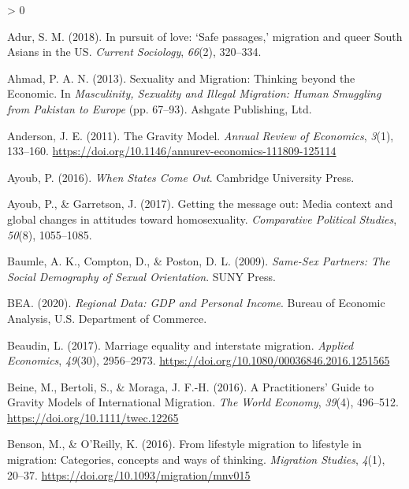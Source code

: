 \documentclass[
  11pt,
]{article}
\newlength{\cslhangindent}
\newenvironment{CSLReferences}[2] %
 {%
  \setlength{\parindent}{0pt}
  \ifodd #1 \everypar{\setlength{\hangindent}{\cslhangindent}}\ignorespaces\fi
  \ifnum #2 > 0
  \setlength{\parskip}{#2\baselineskip}
  \fi
 }%
 {}
\begin{document}
\hypertarget{refs}{}
\begin{CSLReferences}{1}{0}
\leavevmode\hypertarget{ref-adur_2018}{}%
Adur, S. M. (2018). In pursuit of love: {`{Safe} passages,'} migration and queer {South Asians} in the {US}. \emph{Current Sociology}, \emph{66}(2), 320--334.

\leavevmode\hypertarget{ref-ahmad_2013}{}%
Ahmad, P. A. N. (2013). Sexuality and {Migration}: {Thinking} beyond the {Economic}. In \emph{Masculinity, {Sexuality} and {Illegal Migration}: {Human Smuggling} from {Pakistan} to {Europe}} (pp. 67--93). {Ashgate Publishing, Ltd.}

\leavevmode\hypertarget{ref-anderson_2011}{}%
Anderson, J. E. (2011). The {Gravity Model}. \emph{Annual Review of Economics}, \emph{3}(1), 133--160. \url{https://doi.org/10.1146/annurev-economics-111809-125114}

\leavevmode\hypertarget{ref-ayoub_2016}{}%
Ayoub, P. (2016). \emph{When {States Come Out}}. {Cambridge University Press}.

\leavevmode\hypertarget{ref-ayoub_2017}{}%
Ayoub, P., \& Garretson, J. (2017). Getting the message out: {Media} context and global changes in attitudes toward homosexuality. \emph{Comparative Political Studies}, \emph{50}(8), 1055--1085.

\leavevmode\hypertarget{ref-baumle_2009}{}%
Baumle, A. K., Compton, D., \& Poston, D. L. (2009). \emph{Same-{Sex Partners}: {The Social Demography} of {Sexual Orientation}}. {SUNY Press}.

\leavevmode\hypertarget{ref-bea_2020}{}%
BEA. (2020). \emph{Regional {Data}: {GDP} and {Personal Income}}. {Bureau of Economic Analysis, U.S. Department of Commerce}.

\leavevmode\hypertarget{ref-beaudin_2017}{}%
Beaudin, L. (2017). Marriage equality and interstate migration. \emph{Applied Economics}, \emph{49}(30), 2956--2973. \url{https://doi.org/10.1080/00036846.2016.1251565}

\leavevmode\hypertarget{ref-beine_2016}{}%
Beine, M., Bertoli, S., \& Moraga, J. F.-H. (2016). A {Practitioners}' {Guide} to {Gravity Models} of {International Migration}. \emph{The World Economy}, \emph{39}(4), 496--512. \url{https://doi.org/10.1111/twec.12265}

\leavevmode\hypertarget{ref-benson_2016}{}%
Benson, M., \& O'Reilly, K. (2016). From lifestyle migration to lifestyle in migration: {Categories}, concepts and ways of thinking. \emph{Migration Studies}, \emph{4}(1), 20--37. \url{https://doi.org/10.1093/migration/mnv015}


\end{CSLReferences}
\end{document}
